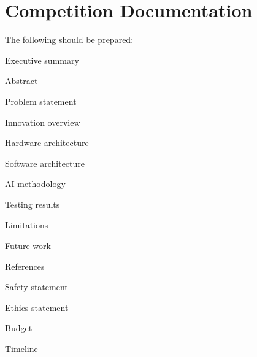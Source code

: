 \section{Competition Documentation}
\label{sec:competition-documentation}

The following should be prepared:
\begin{checklist}
    \item Executive summary
    \item Abstract
    \item Problem statement
    \item Innovation overview
    \item Hardware architecture
    \item Software architecture
    \item AI methodology
    \item Testing results
    \item Limitations
    \item Future work
    \item References
    \item Safety statement
    \item Ethics statement
    \item Budget
    \item Timeline
\end{checklist}
